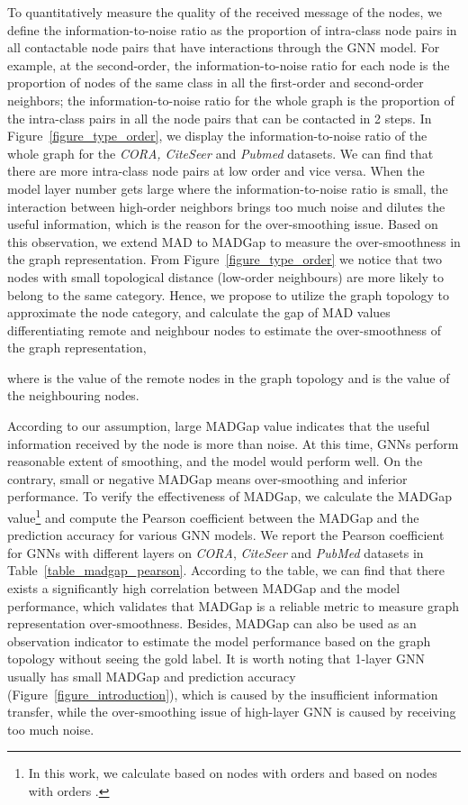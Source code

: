\documentclass[letterpaper]{article} \usepackage{aaai20}  \usepackage{times}  \usepackage{helvet} \usepackage{courier}  \usepackage[hyphens]{url}  \usepackage{graphicx} \urlstyle{rm} \def\UrlFont{\rm}  \frenchspacing  \setlength{\pdfpagewidth}{8.5in}  \setlength{\pdfpageheight}{11in}  \setcounter{secnumdepth}{0}
\begin{document}
To quantitatively measure the quality of the received message of the nodes, we define the information-to-noise ratio as the proportion of intra-class node pairs in all contactable node pairs that have interactions through the GNN model. For example, at the second-order, the information-to-noise ratio for each node is the proportion of nodes of the same class in all the first-order and second-order neighbors; the information-to-noise ratio for the whole graph is the proportion of the intra-class pairs in all the node pairs that can be contacted in 2 steps.
In Figure~\ref{figure_type_order}, we display the information-to-noise ratio of the whole graph for the \textit{CORA, CiteSeer} and \textit{Pubmed} datasets.
We can find that there are more intra-class node pairs at low order and vice versa. 
When the model layer number gets large where the information-to-noise ratio is small, the interaction between high-order neighbors brings too much noise and dilutes the useful information, which is the reason for the over-smoothing issue.
Based on this observation, we extend MAD to MADGap to measure the over-smoothness in the graph representation. 
From Figure~\ref{figure_type_order} we notice that two nodes with small topological distance (low-order neighbours) are more likely to belong to the same category. Hence, we propose to utilize the graph topology to approximate the node category, and calculate the gap of MAD values differentiating remote and neighbour nodes to estimate the over-smoothness of the graph representation,

where  is the  value of the remote nodes in the graph topology and  is the  value of the neighbouring nodes.

According to our assumption, large MADGap value indicates that the useful information received by the node is more than noise. At this time, GNNs perform reasonable extent of smoothing, and the model would perform well. On the contrary, small or negative MADGap means over-smoothing and inferior performance. 
To verify the effectiveness of MADGap, we calculate the MADGap value\footnote{In this work, we calculate  based on nodes with orders  and  based on nodes with orders .} and compute the Pearson coefficient between the MADGap and the prediction accuracy for various GNN models. 
We report the Pearson coefficient for GNNs with different layers on \textit{CORA}, \textit{CiteSeer} and \textit{PubMed} datasets in Table~\ref{table_madgap_pearson}.
According to the table, we can find that there exists a significantly high correlation between MADGap and the model performance, which validates that MADGap is a reliable metric to measure graph representation over-smoothness. Besides, MADGap can also be used as an observation indicator to estimate the model performance based on the graph topology without seeing the gold label.
It is worth noting that 1-layer GNN usually has small MADGap and prediction accuracy (Figure~\ref{figure_introduction}), which is caused by the insufficient information transfer, while the over-smoothing issue of high-layer GNN is caused by receiving too much noise.
 
\end{document}
